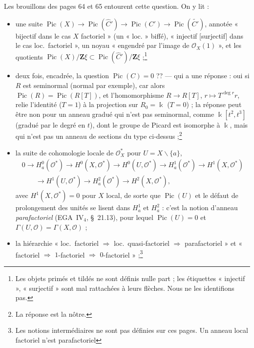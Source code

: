 \documentclass[11pt,a4paper]{article}
\begin{document}
Les brouillons des pages 64 et 65 entourent cette question. On y lit :
\begin{itemize}
\item une suite $\operatorname{Pic}(X) \to \operatorname{Pic}(\widehat{C}') \to
\operatorname{Pic}(C') \to \operatorname{Pic}(\widetilde{C'})$, annotée
« bijectif dans le cas $X$ factoriel » (un « loc. » biffé), « injectif
[surjectif] dans le cas loc.\ factoriel », un noyau
« engendré par l'image de $\mathcal{O}_X(1)$ », et les quotients
$\operatorname{Pic}(X)/\mathbf{Z}\xi \subset
\operatorname{Pic}(\widehat{C}')/\mathbf{Z}\xi$ ;\footnote{Les objets
primés et tildés ne sont définis nulle part ; les étiquettes « injectif »,
« surjectif » sont mal rattachées à leurs flèches. Nous ne les identifions
pas.}
\item deux fois, encadrée, la question $\operatorname{Pic}(C) = 0$ ?? ---
qui a une réponse : oui si $R$ est seminormal (normal par exemple), car alors
$\operatorname{Pic}(R) = \operatorname{Pic}(R[T])$, et l'homomorphisme
$R \to R[T]$, $r \mapsto T^{\deg r} r$, relie l'identité ($T = 1$) à la
projection sur $R_0 = \Bbbk$ ($T = 0$) ; la réponse peut être non pour un
anneau gradué qui n'est pas seminormal, comme $\Bbbk[t^2, t^3]$ (gradué par
le degré en $t$), dont le groupe de Picard est isomorphe à $\Bbbk$, mais qui
n'est pas un anneau de sections du type ci-dessus ;\footnote{La réponse est la nôtre.}
\item la suite de cohomologie locale de $\mathcal{O}_X^*$ pour
$U = X \smallsetminus \lbrace a \rbrace$,
\[
  \begin{array}{l}
  0 \to H^0_a(\mathcal{O}^*) \to H^0(X, \mathcal{O}^*) \to H^0(U, \mathcal{O}^*)
  \to H^1_a(\mathcal{O}^*) \to H^1(X, \mathcal{O}^*) \\
  \qquad \to H^1(U, \mathcal{O}^*) \to H^2_a(\mathcal{O}^*) \to H^2(X, \mathcal{O}^*),
  \end{array}
\]
avec $H^1(X, \mathcal{O}^*) = 0$ pour $X$ local, de sorte que
$\operatorname{Pic}(U)$ et le défaut de prolongement des unités se lisent dans
$H^1_a$ et $H^2_a$ : c'est la notion d'anneau \emph{parafactoriel}
(EGA~IV$_4$, §~21.13), pour lequel $\operatorname{Pic}(U) = 0$ et
$\Gamma(U, \mathcal{O}) = \Gamma(X, \mathcal{O})$ ;
\item la hiérarchie « loc.\ factoriel $\Rightarrow$ loc.\ quasi-factoriel
$\Rightarrow$ parafactoriel » et « factoriel $\Rightarrow$ $1$-factoriel
$\Rightarrow$ $0$-factoriel » ;\footnote{Les notions intermédiaires ne sont
pas définies sur ces pages. Un anneau local factoriel n'est parafactoriel
}
\end{itemize}
\end{document}

